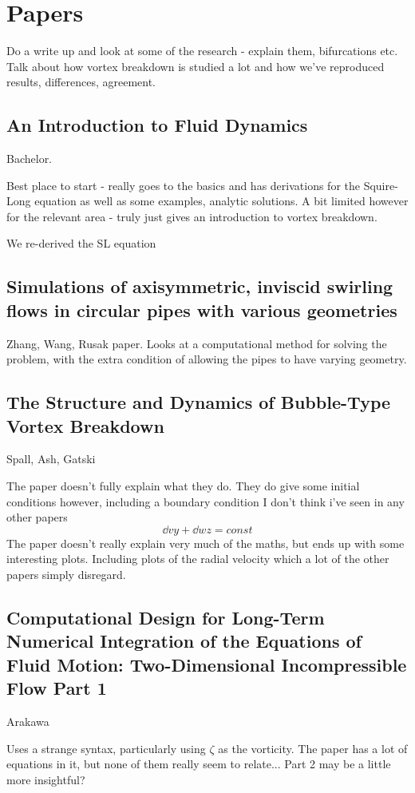 \documentclass{X:/Documents/Coding/Latex/myreport}
\begin{document}
\section{Papers}


Do a write up and look at some of the research - explain them, bifurcations etc.
Talk about how vortex breakdown is studied a lot and how we've reproduced results, differences, agreement.


\subsection{An Introduction to Fluid Dynamics}
Bachelor.

Best place to start - really goes to the basics and has derivations for the Squire-Long equation as well as some examples, analytic solutions.
A bit limited however for the relevant area - truly just gives an introduction to vortex breakdown.

We re-derived the SL equation

\subsection{Simulations of axisymmetric, inviscid swirling flows in circular pipes with various geometries}
Zhang, Wang, Rusak paper.
Looks at a computational method for solving the problem, with the extra condition of allowing the pipes to have varying geometry.



\subsection{The Structure and Dynamics of Bubble-Type Vortex Breakdown}
Spall, Ash, Gatski

The paper doesn't fully explain what they do. They do give some initial conditions however, including a boundary condition I don't think i've seen in any other papers
\[\dd vy + \dd wz = const\]
The paper doesn't really explain very much of the maths, but ends up with some interesting plots.
Including plots of the radial velocity which a lot of the other papers simply disregard.
\subsection{Computational Design for Long-Term Numerical Integration of the Equations of Fluid Motion: Two-Dimensional Incompressible Flow Part 1}
Arakawa

Uses a strange syntax, particularly using $\zeta$ as the vorticity.
The paper has a lot of equations in it, but none of them really seem to relate... Part 2 may be a little more insightful?
\end{document}
